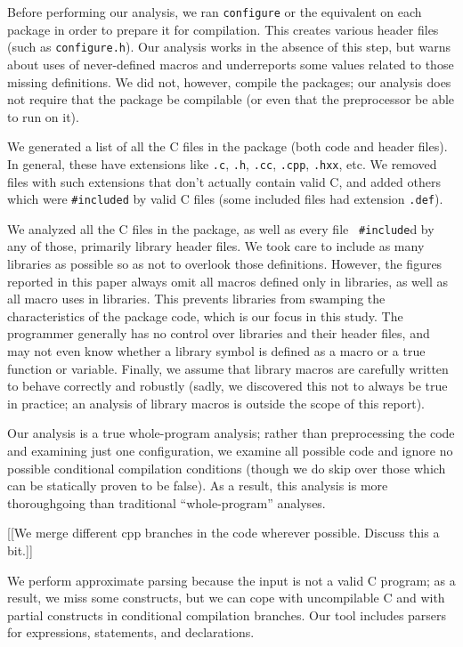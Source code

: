 \documentclass[10pt]{article}
\newcommand{\file}[1]{\texttt{#1}}
\begin{document}
Before performing our analysis, we ran {\tt configure} or the equivalent on
each package in order to prepare it for compilation.  This creates various
header files (such as \file{configure.h}).  Our analysis works in the
absence of this step, but warns about uses of never-defined macros and
underreports some values related to those missing definitions.  We did
not, however, compile the packages; our analysis does not require that the
package be compilable (or even that the preprocessor be able to run on it).

We generated a list of all the C files in the package (both code and header
files).  In general, these have extensions like \file{.c}, \file{.h},
\file{.cc}, \file{.cpp}, \file{.hxx}, etc.  We removed files with such
extensions that don't actually contain valid C, and added others which were
{\tt \#included} by valid C files (some included files had extension
\file{.def}).

We analyzed all the C files in the package, as well as every file {\tt
\#include}d by any of those, primarily library header files.  We
took care to include as many libraries as possible so as not to overlook
those definitions.  However, the figures reported in this paper always omit
all macros defined only in libraries, as well as all macro uses in
libraries.  This prevents libraries from 
swamping the characteristics of the package code, which is our focus in
this study.  The programmer generally has no control over libraries and
their header files, and may not even know whether a library symbol is
defined as a macro or a true function or variable.  Finally, we assume that
library macros are carefully written to behave correctly and robustly
(sadly, we discovered this not to always be true in practice; an
analysis of library macros is outside the scope of this report).

Our analysis is a true whole-program analysis; rather than preprocessing the
code and examining just one configuration, we examine all possible code and
ignore no possible  conditional compilation conditions (though we do skip
over those which can be statically proven to be false).   As a result, this
analysis is more thoroughgoing than traditional ``whole-program'' analyses.

[[We merge different cpp branches in the code wherever possible.  Discuss
this a bit.]]

We perform approximate parsing because the input is not a valid C program;
as a result, we miss some constructs, but we can cope with uncompilable C
and with partial constructs in conditional compilation branches.  Our tool
includes parsers for expressions, statements, and declarations.
\end{document}
